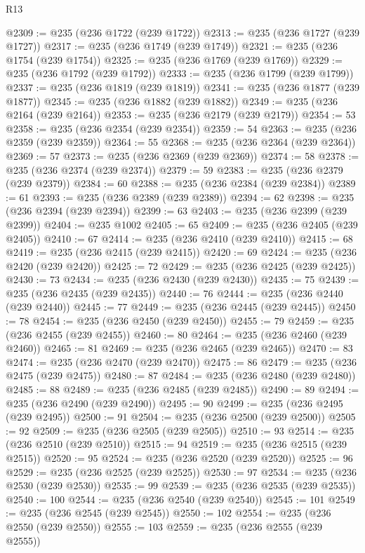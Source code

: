 \begin{lexlean}{R13}
\begin{coremodule}
@2309 := @235 (@236 @1722 (@239 @1722))
@2313 := @235 (@236 @1727 (@239 @1727))
@2317 := @235 (@236 @1749 (@239 @1749))
@2321 := @235 (@236 @1754 (@239 @1754))
@2325 := @235 (@236 @1769 (@239 @1769))
@2329 := @235 (@236 @1792 (@239 @1792))
@2333 := @235 (@236 @1799 (@239 @1799))
@2337 := @235 (@236 @1819 (@239 @1819))
@2341 := @235 (@236 @1877 (@239 @1877))
@2345 := @235 (@236 @1882 (@239 @1882))
@2349 := @235 (@236 @2164 (@239 @2164))
@2353 := @235 (@236 @2179 (@239 @2179))
@2354 := 53
@2358 := @235 (@236 @2354 (@239 @2354))
@2359 := 54
@2363 := @235 (@236 @2359 (@239 @2359))
@2364 := 55
@2368 := @235 (@236 @2364 (@239 @2364))
@2369 := 57
@2373 := @235 (@236 @2369 (@239 @2369))
@2374 := 58
@2378 := @235 (@236 @2374 (@239 @2374))
@2379 := 59
@2383 := @235 (@236 @2379 (@239 @2379))
@2384 := 60
@2388 := @235 (@236 @2384 (@239 @2384))
@2389 := 61
@2393 := @235 (@236 @2389 (@239 @2389))
@2394 := 62
@2398 := @235 (@236 @2394 (@239 @2394))
@2399 := 63
@2403 := @235 (@236 @2399 (@239 @2399))
@2404 := @235 @1002
@2405 := 65
@2409 := @235 (@236 @2405 (@239 @2405))
@2410 := 67
@2414 := @235 (@236 @2410 (@239 @2410))
@2415 := 68
@2419 := @235 (@236 @2415 (@239 @2415))
@2420 := 69
@2424 := @235 (@236 @2420 (@239 @2420))
@2425 := 72
@2429 := @235 (@236 @2425 (@239 @2425))
@2430 := 73
@2434 := @235 (@236 @2430 (@239 @2430))
@2435 := 75
@2439 := @235 (@236 @2435 (@239 @2435))
@2440 := 76
@2444 := @235 (@236 @2440 (@239 @2440))
@2445 := 77
@2449 := @235 (@236 @2445 (@239 @2445))
@2450 := 78
@2454 := @235 (@236 @2450 (@239 @2450))
@2455 := 79
@2459 := @235 (@236 @2455 (@239 @2455))
@2460 := 80
@2464 := @235 (@236 @2460 (@239 @2460))
@2465 := 81
@2469 := @235 (@236 @2465 (@239 @2465))
@2470 := 83
@2474 := @235 (@236 @2470 (@239 @2470))
@2475 := 86
@2479 := @235 (@236 @2475 (@239 @2475))
@2480 := 87
@2484 := @235 (@236 @2480 (@239 @2480))
@2485 := 88
@2489 := @235 (@236 @2485 (@239 @2485))
@2490 := 89
@2494 := @235 (@236 @2490 (@239 @2490))
@2495 := 90
@2499 := @235 (@236 @2495 (@239 @2495))
@2500 := 91
@2504 := @235 (@236 @2500 (@239 @2500))
@2505 := 92
@2509 := @235 (@236 @2505 (@239 @2505))
@2510 := 93
@2514 := @235 (@236 @2510 (@239 @2510))
@2515 := 94
@2519 := @235 (@236 @2515 (@239 @2515))
@2520 := 95
@2524 := @235 (@236 @2520 (@239 @2520))
@2525 := 96
@2529 := @235 (@236 @2525 (@239 @2525))
@2530 := 97
@2534 := @235 (@236 @2530 (@239 @2530))
@2535 := 99
@2539 := @235 (@236 @2535 (@239 @2535))
@2540 := 100
@2544 := @235 (@236 @2540 (@239 @2540))
@2545 := 101
@2549 := @235 (@236 @2545 (@239 @2545))
@2550 := 102
@2554 := @235 (@236 @2550 (@239 @2550))
@2555 := 103
@2559 := @235 (@236 @2555 (@239 @2555))

\end{coremodule}
\end{lexlean}
